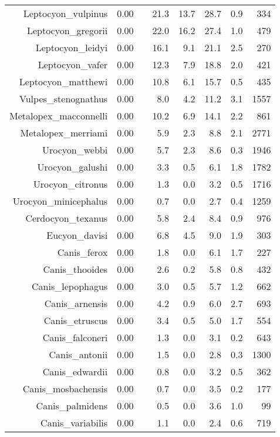 \begin{table}[ht]
\begin{tabular}{rrrrrrrr}
  Leptocyon\_vulpinus & 0.00 &  & 21.3 & 13.7 & 28.7 & 0.9 & 334 \\ 
  Leptocyon\_gregorii & 0.00 &  & 22.0 & 16.2 & 27.4 & 1.0 & 479 \\ 
  Leptocyon\_leidyi & 0.00 &  & 16.1 & 9.1 & 21.1 & 2.5 & 270 \\ 
  Leptocyon\_vafer & 0.00 &  & 12.3 & 7.9 & 18.8 & 2.0 & 421 \\ 
  Leptocyon\_matthewi & 0.00 &  & 10.8 & 6.1 & 15.7 & 0.5 & 435 \\ 
  Vulpes\_stenognathus & 0.00 &  & 8.0 & 4.2 & 11.2 & 3.1 & 1557 \\ 
  Metalopex\_macconnelli & 0.00 &  & 10.2 & 6.9 & 14.1 & 2.2 & 861 \\ 
  Metalopex\_merriami & 0.00 &  & 5.9 & 2.3 & 8.8 & 2.1 & 2771 \\ 
  Urocyon\_webbi & 0.00 &  & 5.7 & 2.3 & 8.6 & 0.3 & 1946 \\ 
  Urocyon\_galushi & 0.00 &  & 3.3 & 0.5 & 6.1 & 1.8 & 1782 \\ 
  Urocyon\_citronus & 0.00 &  & 1.3 & 0.0 & 3.2 & 0.5 & 1716 \\ 
  Urocyon\_minicephalus & 0.00 &  & 0.7 & 0.0 & 2.7 & 0.4 & 1259 \\ 
  Cerdocyon\_texanus & 0.00 &  & 5.8 & 2.4 & 8.4 & 0.9 & 976 \\ 
  Eucyon\_davisi & 0.00 &  & 6.8 & 4.5 & 9.0 & 1.9 & 303 \\ 
  Canis\_ferox & 0.00 &  & 1.8 & 0.0 & 6.1 & 1.7 & 227 \\ 
  Canis\_thooides & 0.00 &  & 2.6 & 0.2 & 5.8 & 0.8 & 432 \\ 
  Canis\_lepophagus & 0.00 &  & 3.0 & 0.5 & 5.7 & 1.2 & 662 \\ 
  Canis\_arnensis & 0.00 &  & 4.2 & 0.9 & 6.0 & 2.7 & 693 \\ 
  Canis\_etruscus & 0.00 &  & 3.4 & 0.5 & 5.0 & 1.7 & 554 \\ 
  Canis\_falconeri & 0.00 &  & 1.3 & 0.0 & 3.1 & 0.2 & 643 \\ 
  Canis\_antonii & 0.00 &  & 1.5 & 0.0 & 2.8 & 0.3 & 1300 \\ 
  Canis\_edwardii & 0.00 &  & 0.8 & 0.0 & 3.2 & 0.5 & 362 \\ 
  Canis\_mosbachensis & 0.00 &  & 0.7 & 0.0 & 3.5 & 0.2 & 177 \\ 
  Canis\_palmidens & 0.00 &  & 0.5 & 0.0 & 3.6 & 1.0 & 99 \\ 
  Canis\_variabilis & 0.00 &  & 1.1 & 0.0 & 2.4 & 0.6 & 719 \\ 

\end{tabular}
\end{table}
